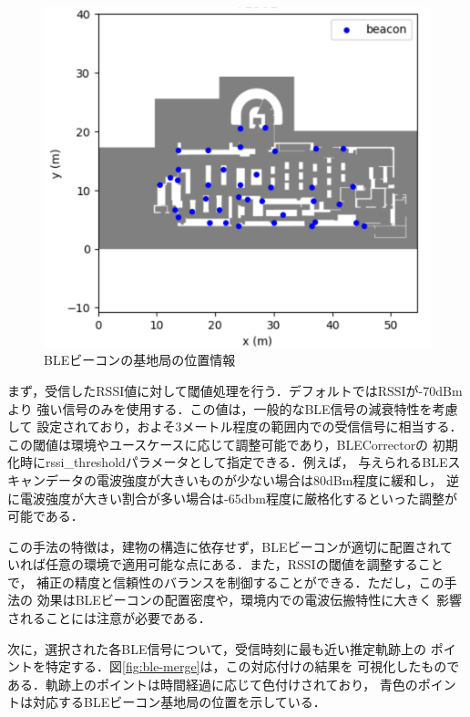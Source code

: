 \begin{figure}[H]
	\centering
	\includegraphics[width=\linewidth]{image/ble-beacon-position.jpg}
	\caption{BLEビーコンの基地局の位置情報}    \label{fig:ble-beacon-position}
\end{figure}

まず，受信したRSSI値に対して閾値処理を行う．デフォルトではRSSIが-70dBmより
強い信号のみを使用する．この値は，一般的なBLE信号の減衰特性を考慮して
設定されており，およそ3メートル程度の範囲内での受信信号に相当する．
この閾値は環境やユースケースに応じて調整可能であり，BLECorrectorの
初期化時にrssi\_thresholdパラメータとして指定できる．例えば，
与えられるBLEスキャンデータの電波強度が大きいものが少ない場合は80dBm程度に緩和し，
逆に電波強度が大きい割合が多い場合は-65dbm程度に厳格化するといった調整が可能である．

この手法の特徴は，建物の構造に依存せず，BLEビーコンが適切に配置されて
いれば任意の環境で適用可能な点にある．また，RSSIの閾値を調整することで，
補正の精度と信頼性のバランスを制御することができる．ただし，この手法の
効果はBLEビーコンの配置密度や，環境内での電波伝搬特性に大きく
影響されることには注意が必要である．

次に，選択された各BLE信号について，受信時刻に最も近い推定軌跡上の
ポイントを特定する．図\ref{fig:ble-merge}は，この対応付けの結果を
可視化したものである．軌跡上のポイントは時間経過に応じて色付けされており，
青色のポイントは対応するBLEビーコン基地局の位置を示している．

